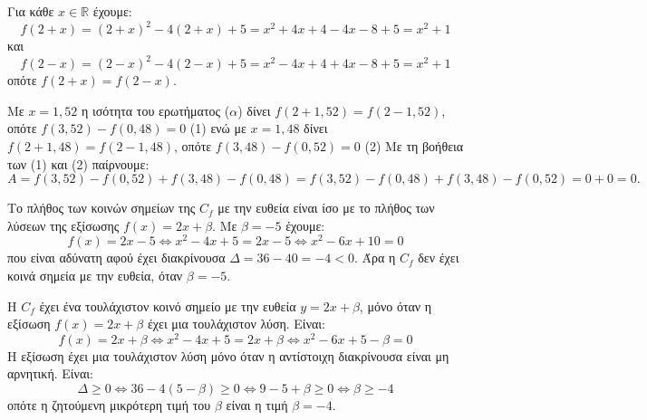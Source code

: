 
\begin{alist}
\item Για κάθε $x \in \mathbb{R}$ έχουμε:
\[f(2 + x) = (2 + x)^2 - 4(2 + x) + 5 = x^2 + 4x + 4 - 4x - 8 + 5 = x^2 + 1\]
και
\[f(2 - x) = (2 - x)^2 - 4(2 - x) + 5 = x^2 - 4x + 4 + 4x - 8 + 5 = x^2 + 1\]
οπότε $f(2 + x) = f(2 - x)$.

\item Με $x = 1,52$ η ισότητα του ερωτήματος ($\alpha$) δίνει
$f(2 + 1,52) = f(2 - 1,52)$, οπότε $f(3,52) - f(0,48) = 0$ (1)
ενώ με $x = 1,48$ δίνει
$f(2 + 1,48) = f(2 - 1,48)$, οπότε $f(3,48) - f(0,52) = 0$ (2)
Με τη βοήθεια των (1) και (2) παίρνουμε:
\[A = f(3,52) - f(0,52) + f(3,48) - f(0,48) = f(3,52) - f(0,48) + f(3,48) - f(0,52) = 0 + 0 = 0.\]

\item Το πλήθος των κοινών σημείων της $C_f$ με την ευθεία είναι ίσο με το πλήθος των λύσεων
της εξίσωσης $f(x) = 2x + \beta$. Με $\beta = -5$ έχουμε:
\[f(x) = 2x - 5 \Leftrightarrow x^2 - 4x + 5 = 2x - 5 \Leftrightarrow x^2 - 6x + 10 = 0\]
που είναι αδύνατη αφού έχει διακρίνουσα $\Delta = 36 - 40 = -4 < 0$.
Άρα η $C_f$ δεν έχει κοινά σημεία με την ευθεία, όταν $\beta = -5$.

\item Η $C_f$ έχει ένα τουλάχιστον κοινό σημείο με την ευθεία $y = 2x + \beta$, μόνο όταν η εξίσωση
$f(x) = 2x + \beta$ έχει μια τουλάχιστον λύση. Είναι:
\[f(x) = 2x + \beta \Leftrightarrow x^2 - 4x + 5 = 2x + \beta \Leftrightarrow x^2 - 6x + 5 - \beta = 0\]
Η εξίσωση έχει μια τουλάχιστον λύση μόνο όταν η αντίστοιχη διακρίνουσα είναι μη αρνητική. Είναι:
\[\Delta \ge 0 \Leftrightarrow 36 - 4(5 - \beta) \ge 0 \Leftrightarrow 9 - 5 + \beta \ge 0 \Leftrightarrow \beta \ge -4\]
οπότε η ζητούμενη μικρότερη τιμή του $\beta$ είναι η τιμή $\beta = -4$.
\end{alist}

